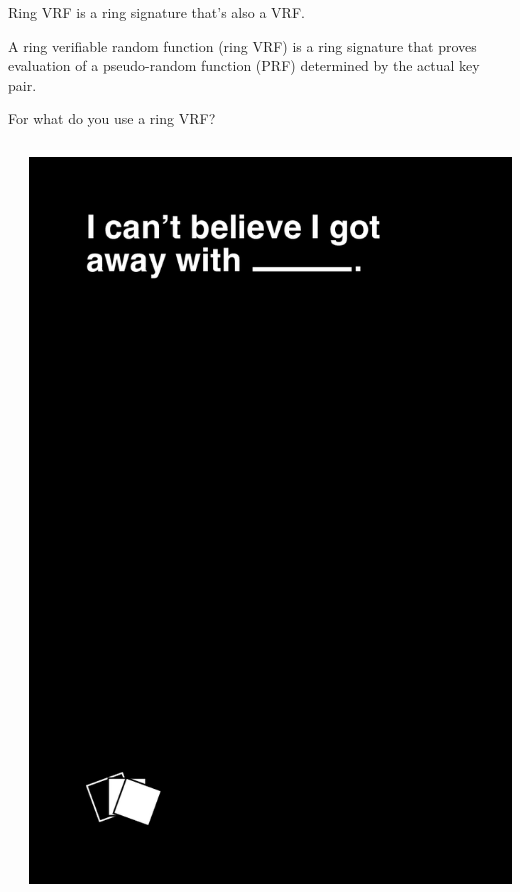 \documentclass{beamer}
\begin{document}
\begin{frame}

Ring VRF is a ring signature that's also a VRF.

\bigskip\bigskip 

A ring verifiable random function (ring VRF) is a ring signature that proves evaluation of a pseudo-random function (PRF) determined by the actual key pair.

\end{frame}



\begin{frame}

For what do you use a ring VRF?

\bigskip\bigskip


\begin{columns}
        \begin{column}[t]{0.1\textwidth}
        \end{column}
        \begin{column}[t]{0.3\textwidth}
                \includegraphics[width=.9\textwidth]{../images/black_FRONT012.png} %

\end{column}
\end{columns}
\end{frame}
\end{document}
